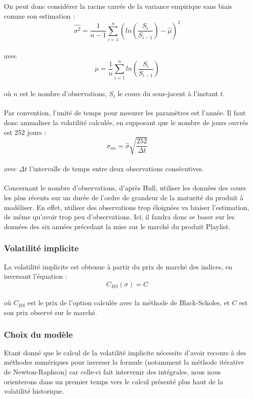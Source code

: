 \documentclass[french,12pt,a4paper]{article}
\begin{document}
On peut donc considérer la racine carrée de la variance empirique sans biais comme son estimation :\\
$$ \widehat{\sigma^{2}} = \frac{1}{n-1} \sum_{i=1}^n (ln(\frac{S_{i}}{S_{i-1}}) - \widehat{\mu})^{2} $$ \\
avec \\
$$ \widehat{\mu} = \frac{1}{n} \sum_{i=1}^n ln(\frac{S_{i}}{S_{i-1}}) $$ \\
où $n$ est le nombre d'observations, $S_{t}$ le cours du sous-jacent à l'instant $t$. \\ \\
Par convention, l'unité de temps pour mesurer les paramètres est l'année. Il faut donc annualiser la volatilité calculée, en supposant que le nombre de jours ouvrés est 252 jours : \\
$$ \sigma_{an} = \widehat{\sigma} \sqrt{\frac{252}{\Delta t}} $$ \\
avec $\Delta t $ l'intervalle de temps entre deux observations consécutives.\\ \\
Concernant le nombre d'observations, d'après Hull, utiliser les données des cours les plus récents sur un durée de l'ordre de grandeur de la maturité du produit à modéliser. En effet, utiliser des observations trop éloignées va biaiser l'estimation, de même qu'avoir trop peu d'observations. Ici, il faudra donc se baser sur les données des six années précedant la mise sur le marché du produit Playlist.\\

\subsubsection{Volatilité implicite}
La volatilité implicite est obtenue à partir du prix de marché des indices, en inversant l'équation :
$$ C_{BS}(\sigma) = C $$ \\
où $C_{BS}$ est le prix de l'option calculée avec la méthode de Black-Scholes, et $C$ est son prix observé sur le marché.\\

\subsubsection{Choix du modèle}
Etant donné que le calcul de la volatilité implicite nécessite d'avoir recours à des méthodes numériques pour inverser la formule (notamment la méthode itérative de Newton-Raphson) car celle-ci fait intervenir des intégrales, nous nous orienterons dans un premier temps vers le calcul présenté plus haut de la volatilité historique.
\end{document}
